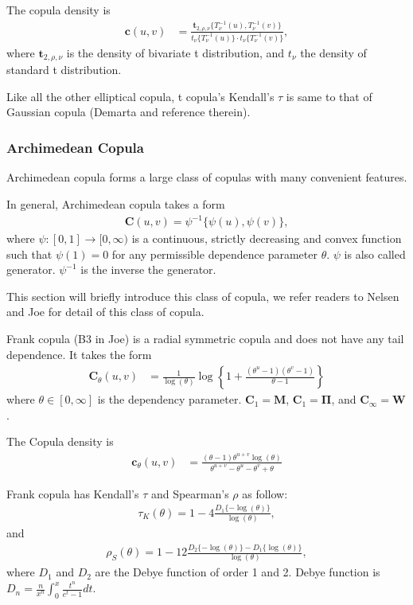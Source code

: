 The copula density is
\begin{align}
    \bm{c}(u,v) &= \frac{\bm{t}_{2, \rho, \nu}\{T^{-1}_\nu(u), T^{-1}_\nu(v)\}}
    {t_\nu\{T^{-1}_\nu(u)\}\cdot t_\nu\{T^{-1}_\nu(v)\}},
    \end{align}
where $\bm{t}_{2,\rho, \nu}$ is the density of bivariate t distribution,
and $t_\nu$ the density of standard t distribution.\medskip

Like all the other elliptical copula, t copula's Kendall's $\tau$ is same to that of Gaussian copula (Demarta and reference therein).

\subsubsection{Archimedean Copula}\label{sec:archimedean-copula}
Archimedean copula forms a large class of copulas with many convenient features.\medskip

In general, Archimedean copula takes a form
\begin{align}
    \bm{C}(u,v)= \psi^{-1}\{\psi(u), \psi(v)\},
    \end{align}
where $\psi:[0,1] \rightarrow [0,\infty)$ is a continuous, strictly decreasing and convex function such that
$\psi(1)=0$ for any permissible dependence parameter $\theta$. $\psi$ is also called generator.
$\psi^{-1}$ is the inverse the generator.\medskip

This section will briefly introduce this class of copula,
we refer readers to Nelsen and Joe for detail of this class of copula.\medskip

Frank copula (B3 in Joe) is a radial symmetric copula and does not have any tail dependence.
It takes the form
\begin{align}
    \bm{C}_{\theta}(u,v) &= \frac{1}{\log(\theta)}
    \log \left\{
    1 + \frac{(\theta^u-1)(\theta^v-1)}{\theta-1}
    \right\}
    \end{align}
where $\theta \in [0, \infty]$ is the dependency parameter.
$\bm{C}_1 = \bm{M}$, $\bm{C}_1 = \bm{\Pi}$, and $\bm{C}_\infty = \bm{W}$.

The Copula density is
\begin{align}
    \bm{c}_{\theta}(u,v) &= \frac{(\theta-1)\theta^{u+v}\log(\theta)}
    {\theta^{u+v}-\theta^u-\theta^v+\theta}
    \end{align}\medskip

Frank copula has Kendall's $\tau$ and Spearman's $\rho$ as follow:
\begin{align}
    \tau_K(\theta) = 1-4\frac{D_1\{-\log(\theta)\}}{\log(\theta)},
    \end{align}
and
\begin{align}
    \rho_S(\theta) = 1-12\frac{D_2\{-\log(\theta)\} - D_1\{\log(\theta)\}}{\log(\theta)},
    \end{align}
where $D_1$ and $D_2$ are the Debye function of order 1 and 2.
Debye function is $D_n = \frac{n}{x^n}\int_0^x\frac{t^n}{e^t-1}dt$.\medskip

